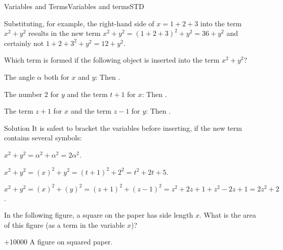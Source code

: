 \begin{MXContent}{Variables and Terms}{Variables and terms}{STD}
\begin{MExample}
Substituting, for example, the right-hand side of $x=1+2+3$ into the term $x^2+y^2$
results in the new term 
$x^2+y^2=(1+2+3)^2+y^2=36+y^2$ and certainly not $1+2+3^2+y^2=12+y^2$.
\end{MExample}

\begin{MExercise}
Which term is formed if the following object is inserted into the term $x^2+y^2$?
\begin{MExerciseItems}
\item{The angle $\alpha$ both for $x$ and $y$: Then .}
\item{The number $2$ for $y$ and the term $t+1$ for $x$: Then .}
\item{The term $z+1$ for $x$ and the term $z-1$ for $y$: Then .}
\end{MExerciseItems}

\begin{MHint}{Solution}
It is safest to bracket the variables before inserting, if the new term contains several symbols:
\begin{MExerciseItems}
\item{$x^2+y^2=\alpha^2+\alpha^2=2\alpha^2$.}
\item{$x^2+y^2=(x)^2+y^2=(t+1)^2+2^2=t^2+2t+5$.}
\item{$x^2+y^2=(x)^2+(y)^2=(z+1)^2+(z-1)^2=z^2+2z+1+z^2-2z+1=2z^2+2$.}
\end{MExerciseItems}
\end{MHint}
\end{MExercise}

\begin{MExercise}
In the following figure, a square on the paper has side length $x$. What is the area of this figure (as a term in the variable $x$)?

\begin{center}
\par\ifttm\else\penalty+10000\fi
A figure on squared paper.
\end{center}


\end{MExercise}
\end{MXContent}

